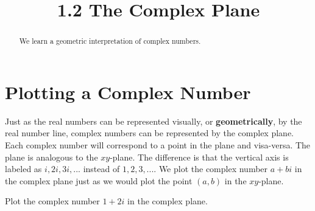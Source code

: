 \documentclass[handout]{ximera}
\title{1.2 The Complex Plane}
\begin{document}
\begin{abstract}
We learn a geometric interpretation of complex numbers.
\end{abstract}

\maketitle

\section{Plotting a Complex Number}

Just as the real numbers can be represented visually, or {\bf geometrically}, by the real number line, 
complex numbers can be represented by the complex plane.  
Each complex number will correspond to a point in the plane and visa-versa. The plane is analogous to the $xy$-plane.  
The difference is that the vertical axis is labeled as $i, 2i, 3i, ...$ instead of $1, 2, 3, ...$.
We plot the complex number $a+bi$ in the complex plane just as we would plot the point $(a,b)$ in the $xy$-plane.


\begin{example}[Example 1]
Plot the complex number $1+2i$ in the complex plane.

\begin{image}
\end{image}


\end{example}
\end{document}
